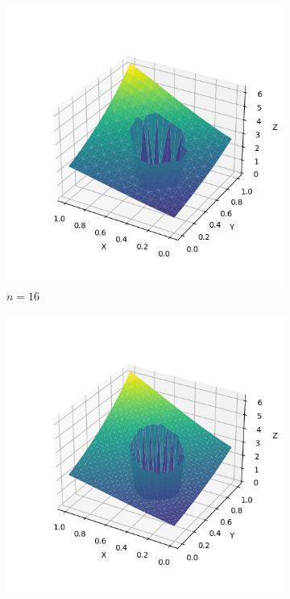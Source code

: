 \documentclass[lang=cn,a4paper,newtx,bibend=bibtex]{elegantpaper}
\begin{document}
\begin{figure}[H]
\begin{subfigure}[b]{0.18\textwidth}
      \includegraphics[width=\textwidth]{../../res_bac/res-[data|1-mixed-irregular-b16].png}
      \caption{$n= 16$}
  \end{subfigure}
  \hfill
  \begin{subfigure}[b]{0.18\textwidth}
      \includegraphics[width=\textwidth]{../../res_bac/res-[data|1-mixed-irregular-c32].png}

\end{subfigure}
\end{figure}
\end{document}
